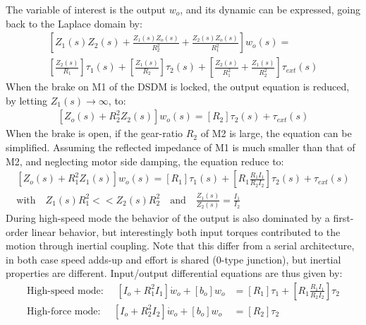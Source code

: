 The variable of interest is the output $w_o$, and its dynamic can be expressed, going back to the Laplace domain by:
%
\begin{align}
\left[
 Z_1(s) Z_2(s) + \frac{Z_1(s) Z_o(s)}{R_2^2} + \frac{Z_2(s) Z_o(s)}{R_1^2}
\right] w_o(s) = \\
\left[
 \frac{Z_2(s)}{R_1}
\right] \tau_1(s)  + 
\left[
 \frac{Z_1(s)}{R_2}
\right] \tau_2(s)  + 
\left[
 \frac{Z_2(s)}{R_1^2} + \frac{Z_1(s) }{R_2^2}
\right] \tau_{ext}(s)
\label{eq:dsdm_output}
\end{align}
%
When the brake on M1 of the DSDM is locked, the output equation is reduced, by letting $Z_1(s) \rightarrow \infty$, to:
%
\begin{align}
\left[
 Z_o(s)  + R_2^2 Z_2(s)
\right] w_o(s) = 
\left[
R_2
\right] \tau_2(s)  + 
\tau_{ext}(s)
\label{eq:dsdm_output_HF}
\end{align}
%
When the brake is open, if the gear-ratio $R_2$ of M2 is large, the equation can be simplified. 
%
%
Assuming the reflected impedance of M1 is much smaller than that of M2, and neglecting motor side damping, the equation reduce to:
%
\begin{align}
\left[
Z_o(s)  + R_1^2 Z_1(s)
\right] w_o(s) = 
\left[
R_1
\right] \tau_1(s)  + 
\left[
R_1 \frac{R_1 I_1}{R_2 I_2}
\right] \tau_2(s)  + 
\tau_{ext}(s) \\
\text{with} \quad Z_1(s) R_1^2 << Z_2(s) R_2^2 
\quad \text{and} \quad \frac{Z_1(s)}{Z_2(s)} = \frac{I_1}{I_2}
\label{eq:dsdm_output_HS}
\end{align}
%
During high-speed mode the behavior of the output is also dominated by a first-order linear behavior, but interestingly both input torques contributed to the motion through inertial coupling. Note that this differ from a serial architecture, in both case speed adds-up and effort is shared (0-type junction), but inertial properties are different. Input/output differential equations are thus given by:
%
\begin{align}
\text{High-speed mode: } \quad \left[ I_o + R_1^2 I_1 \right] \dot{w}_o +  \left[ b_o \right] w_o  &= \left[ R_1 \right] \tau_1 + \left[ R_1 \frac{R_1 I_1}{R_2 I_2} \right] \tau_2 
\label{eq:dsdm_output_HSw0} \\
\text{High-force mode: } \quad \left[ I_o + R_2^2 I_2 \right] \dot{w}_o +  \left[ b_o \right] w_o  &= \left[ R_2 \right] \tau_2 
\label{eq:dsdm_output_HFw0}
\end{align}
